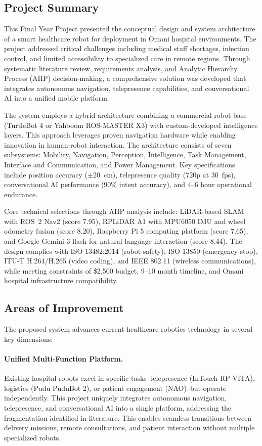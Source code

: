 \subsection{Project Summary}

This Final Year Project presented the conceptual design and system architecture of a smart healthcare robot for deployment in Omani hospital environments. The project addressed critical challenges including medical staff shortages, infection control, and limited accessibility to specialized care in remote regions. Through systematic literature review, requirements analysis, and Analytic Hierarchy Process (AHP) decision-making, a comprehensive solution was developed that integrates autonomous navigation, telepresence capabilities, and conversational AI into a unified mobile platform.

The system employs a hybrid architecture combining a commercial robot base (TurtleBot 4 or Yahboom ROS-MASTER X3) with custom-developed intelligence layers. This approach leverages proven navigation hardware while enabling innovation in human-robot interaction. The architecture consists of seven subsystems: Mobility, Navigation, Perception, Intelligence, Task Management, Interface and Communication, and Power Management. Key specifications include position accuracy ($\pm$20~cm), telepresence quality (720p at 30~fps), conversational AI performance (90\% intent accuracy), and 4--6 hour operational endurance.

Core technical selections through AHP analysis include: LiDAR-based SLAM with ROS~2 Nav2 (score 7.95), RPLiDAR A1 with MPU6050 IMU and wheel odometry fusion (score 8.20), Raspberry Pi 5 computing platform (score 7.65), and Google Gemini 3 flash for natural language interaction (score 8.44). The design complies with ISO 13482:2014 (robot safety), ISO 13850 (emergency stop), ITU-T H.264/H.265 (video coding), and IEEE 802.11 (wireless communications), while meeting constraints of \$2,500 budget, 9--10 month timeline, and Omani hospital infrastructure compatibility.

\subsection{Areas of Improvement}

The proposed system advances current healthcare robotics technology in several key dimensions:

\paragraph{Unified Multi-Function Platform.} Existing hospital robots excel in specific tasks--telepresence (InTouch RP-VITA), logistics (Pudu PuduBot 2), or patient engagement (NAO)--but operate independently. This project uniquely integrates autonomous navigation, telepresence, and conversational AI into a single platform, addressing the fragmentation identified in literature. This enables seamless transitions between delivery missions, remote consultations, and patient interaction without multiple specialized robots.

